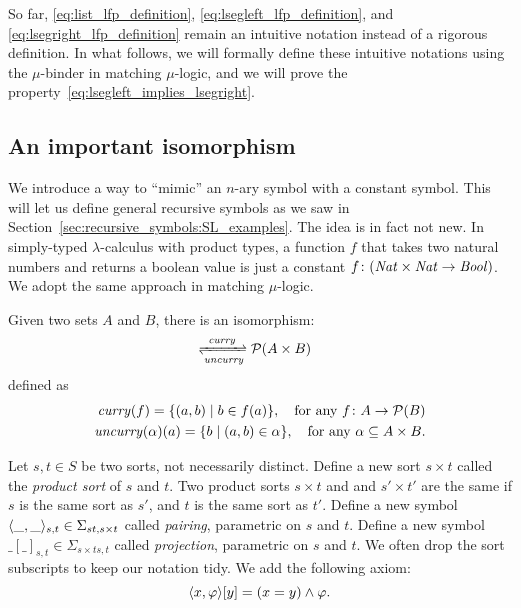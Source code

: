 \documentclass{amsart}
\begin{document}
So far, \eqref{eq:list_lfp_definition}, \eqref{eq:lsegleft_lfp_definition},
and \eqref{eq:lsegright_lfp_definition} remain an intuitive notation
instead of a rigorous definition.
In what follows, we will formally define these intuitive notations
using the $\mu$-binder in matching $\mu$-logic,
and we will prove the property~\eqref{eq:lsegleft_implies_lsegright}.


\subsection{An important isomorphism}
\label{sec:recursive_symbols:isomorphism}

We introduce a way to ``mimic'' an $n$-ary symbol
with a constant symbol.
This will let us define general recursive symbols
as we saw in Section~\ref{sec:recursive_symbols:SL_examples}.
The idea is in fact not new.
In simply-typed $\lambda$-calculus with product types,
a function $f$ that takes two natural numbers and returns
a boolean value is just a constant $f \colon (\mathit{Nat} \times \mathit{Nat} \to \mathit{Bool})$.
We adopt the same approach in matching $\mu$-logic.

\begin{proposition}
Given two sets $A$ and $B$,
there is an isomorphism:
\begin{align}
[A \to \pset{B}] & \xrightleftharpoons[\uncurry]{\curry} \pset{A \times B}
\end{align}
defined as
\begin{align}
\mathit{curry}(f) = \{ (a,b) \mid b \in f(a) \},
\quad \text{for any $f \colon A \to \mathcal{P}(B)$} \\
\mathit{uncurry}(\alpha)(a) = \{ b \mid (a,b) \in \alpha \},
\quad \text{for any $\alpha \subseteq A \times B$.}
\end{align}
\end{proposition}




\begin{definition}
Let $s, t \in S$ be two sorts, not necessarily distinct.
Define a new sort $s \times t$ called the \emph{product sort}
of $s$ and $t$.
Two product sorts $s \times t$ and
and $s' \times t'$ are the same if
$s$ is the same sort as $s'$, and $t$ is the same sort as  $t'$.
Define a new symbol $\langle\_,\_\rangle_{s,t} \in \Sigma_{s t , s \times t}$
called \emph{pairing}, parametric on $s$ and $t$.
Define a new symbol $\_[\_]_{s,t} \in \Sigma_{s \times t s , t}$
called \emph{projection}, parametric on $s$ and $t$.
We often drop the sort subscripts to keep our notation tidy.
We add the following axiom:
\begin{equation}
\label{eq:key_value}
\langle x,\varphi \rangle [y] = (x=y) \wedge \varphi.
\end{equation}
\end{definition}
\end{document}

